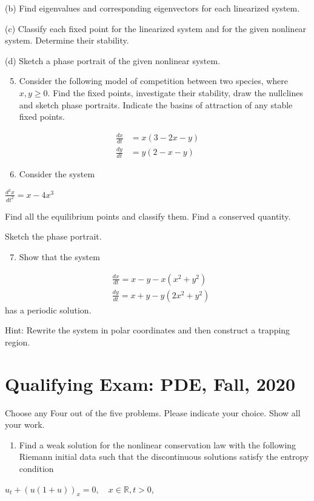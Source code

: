 \documentclass[10pt]{article}
\begin{document}
(b) Find eigenvalues and corresponding eigenvectors for each linearized system.

(c) Classify each fixed point for the linearized system and for the given nonlinear system. Determine their stability.

(d) Sketch a phase portrait of the given nonlinear system.

\begin{enumerate}
  \setcounter{enumi}{4}
  \item Consider the following model of competition between two species, where $x, y \geq 0$. Find the fixed points, investigate their stability, draw the nullclines and sketch phase portraits. Indicate the basins of attraction of any stable fixed points.
\end{enumerate}
$$
\begin{aligned}
\frac{d x}{d t} &=x(3-2 x-y) \\
\frac{d y}{d t} &=y(2-x-y)
\end{aligned}
$$

\begin{enumerate}
  \setcounter{enumi}{5}
  \item Consider the system
\end{enumerate}
$\frac{d^{2} x}{d t^{2}}=x-4 x^{3}$

Find all the equilibrium points and classify them. Find a conserved quantity.

Sketch the phase portrait.

\begin{enumerate}
  \setcounter{enumi}{6}
  \item Show that the system
\end{enumerate}
$$
\begin{aligned}
&\frac{d x}{d t}=x-y-x\left(x^{2}+y^{2}\right) \\
&\frac{d y}{d t}=x+y-y\left(2 x^{2}+y^{2}\right)
\end{aligned}
$$
has a periodic solution.

Hint: Rewrite the system in polar coordinates and then construct a trapping region.

\section{Qualifying Exam: PDE, Fall, 2020}
Choose any Four out of the five problems. Please indicate your choice. Show all your work.

\begin{enumerate}
  \item Find a weak solution for the nonlinear conservation law with the following Riemann initial data such that the discontinuous solutions satisfy the entropy condition
\end{enumerate}
$u_{t}+(u(1+u))_{x}=0, \quad x \in \mathbb{R}, t>0$,
\end{document}
